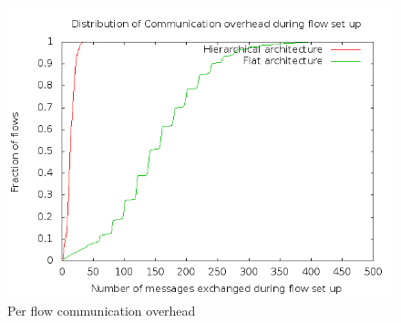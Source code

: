 \documentclass[a0,portrait]{a0poster}
\begin{document}
\begin{multicols}{2}
\begin{figure}[H]
\centering
\includegraphics[scale=1]{msg}
\caption{Per flow communication overhead}
\label{fig:msg}
\end{figure}





\end{multicols}
\end{document}
